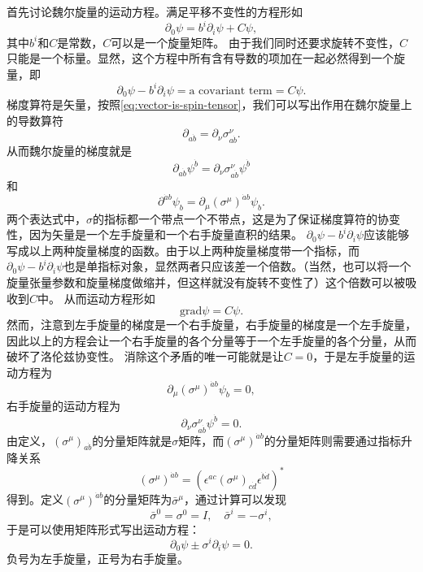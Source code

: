 \documentclass[hyperref, UTF8, a4paper]{ctexart}
\begin{document}
首先讨论魏尔旋量的运动方程。满足平移不变性的方程形如
\[
    \partial_0 \psi = b^i \partial_i \psi + C \psi,
\]
其中$b^i$和$C$是常数，$C$可以是一个旋量矩阵。
由于我们同时还要求旋转不变性，$C$只能是一个标量。显然，这个方程中所有含有导数的项加在一起必然得到一个旋量，即
\[
    \partial_0 \psi - b^i \partial_i \psi = \text{a covariant term} = C \psi.
\]
梯度算符是矢量，按照\eqref{eq:vector-is-spin-tensor}，我们可以写出作用在魏尔旋量上的导数算符
\begin{equation}
    \partial_{a \dot{b}} = \partial_\nu \sigma^\nu_{a \dot{b}}.
\end{equation}
从而魏尔旋量的梯度就是
\[
    \partial_{a \dot{b}} \psi^{\dot{b}} = \partial_\nu \sigma^\nu_{a \dot{b}} \psi^{\dot{b}}
\]
和
\[
    \partial^{\dot{a} b} \psi_b = \partial_\mu (\sigma^\mu)^{\dot{a} b} \psi_b.
\]
两个表达式中，$\sigma$的指标都一个带点一个不带点，这是为了保证梯度算符的协变性，因为矢量是一个左手旋量和一个右手旋量直积的结果。
$\partial_0 \psi - b^i \partial_i \psi$应该能够写成以上两种旋量梯度的函数。由于以上两种旋量梯度带一个指标，而$\partial_0 \psi - b^i \partial_i \psi$也是单指标对象，显然两者只应该差一个倍数。（当然，也可以将一个旋量张量参数和旋量梯度做缩并，但这样就没有旋转不变性了）这个倍数可以被吸收到$C$中。
从而运动方程形如
\[
    \mathrm{grad} \psi = C \psi.
\]
然而，注意到左手旋量的梯度是一个右手旋量，右手旋量的梯度是一个左手旋量，因此以上的方程会让一个右手旋量的各个分量等于一个左手旋量的各个分量，从而破坏了洛伦兹协变性。
消除这个矛盾的唯一可能就是让$C=0$，于是左手旋量的运动方程为
\[
    \partial_\mu (\sigma^\mu)^{\dot{a} b} \psi_b = 0,
\]
右手旋量的运动方程为
\[
    \partial_\nu \sigma^\nu_{a \dot{b}} \psi^{\dot{b}} = 0.
\]
由定义，$(\sigma^\mu)_{a \dot{b}}$的分量矩阵就是$\sigma$矩阵，而$(\sigma^\mu)^{\dot{a} b}$的分量矩阵则需要通过指标升降关系
\[
    (\sigma^\mu)^{\dot{a} b} = (\epsilon^{ac} (\sigma^\mu)_{c \dot{d}} \epsilon^{\dot{b} \dot{d}})^*
\]
得到。定义$(\sigma^\mu)^{\dot{a} b}$的分量矩阵为$\bar{\sigma}^\mu$，通过计算可以发现
\begin{equation}
    \bar{\sigma}^0 = \sigma^0 = I, \quad \bar{\sigma}^i = - \sigma^i,
\end{equation}
于是可以使用矩阵形式写出运动方程：
\begin{equation}
    \partial_0 \psi \pm \sigma^i \partial_i \psi = 0 .
    \label{eq:weyl-eq}
\end{equation}
负号为左手旋量，正号为右手旋量。
\end{document}
